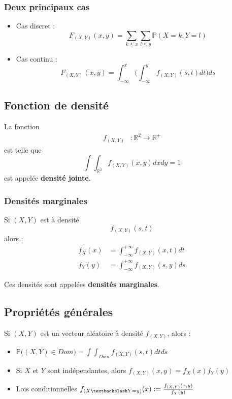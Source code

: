 \documentclass{article}
\begin{document}
\subsubsection{Deux principaux cas}
\begin{itemize}
  \item Cas discret : $$F_{(X,Y)}(x,y) = \sum_{k \leq x}\sum_{l \leq y} \mathbb{P}(X = k, Y = l) $$
  \item Cas continu : $$F_{(X,Y)}(x,y) = \int_{- \infty}^x \Bigg( \int_{- \infty}^y f_{(X,Y)}(s,t)dt \Bigg) ds $$
\end{itemize}

\subsection{Fonction de densité}
La fonction
\begin{align*}
  f_{(X,Y)} &: \mathbb{R}^2 \to \mathbb{R}^+
\end{align*}
est telle que $$ \int \int_{\mathbb{R}^2} f_{(X,Y)}(x,y)dxdy = 1 $$
est appelée \textbf{densité jointe}.

\subsubsection{Densités marginales}

Si $(X,Y)$ est à densité $$ f_{(X,Y)}(s,t) $$ alors :
\begin{align*}
  f_X(x) &= \int_{- \infty}^{+ \infty} f_{(X,Y)}(x,t)dt \\
  f_Y(y) &= \int_{- \infty}^{+ \infty} f_{(X,Y)}(s,y)ds
\end{align*}

Ces densités sont appelées \textbf{densités marginales}.

\subsection{Propriétés générales}
Si $(X,Y)$ est un vecteur aléatoire à densité $f_{(X,Y)}$, alors :
\begin{itemize}
  \item $\mathbb{P}\big( (X,Y) \in \textit{Dom} \big) = \int \int_{\textit{Dom}} f_{(X,Y)}(s,t) dtds $
  \item Si $X$ et $Y$ sont indépendantes, alors $f_{(X,Y)}(x,y) = f_X(x) f_Y(y)$
  \item Lois conditionnelles $f_{(X \textbackslash Y = y)}(x) := \frac{f_{(X,Y)}(x,y)}{f_Y(y)}$
\end{itemize}
\end{document}
